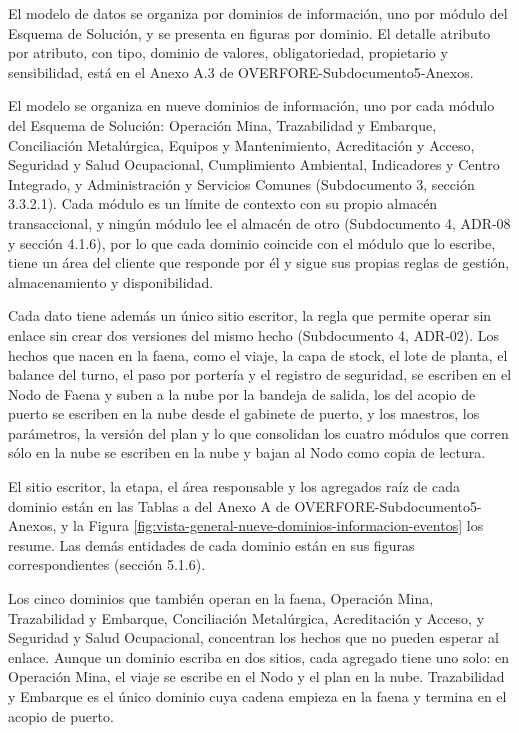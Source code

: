 \documentclass[subdoc]{../../comun/overfore}
\begin{document}
El modelo de datos se organiza por dominios de información, uno por módulo del Esquema de Solución, y se presenta en figuras por dominio. El detalle atributo por atributo, con tipo, dominio de valores, obligatoriedad, propietario y sensibilidad, está en el Anexo A.3 de OVERFORE-Subdocumento5-Anexos.

El modelo se organiza en nueve dominios de información, uno por cada módulo del Esquema de Solución: Operación Mina, Trazabilidad y Embarque, Conciliación Metalúrgica, Equipos y Mantenimiento, Acreditación y Acceso, Seguridad y Salud Ocupacional, Cumplimiento Ambiental, Indicadores y Centro Integrado, y Administración y Servicios Comunes (Subdocumento 3, sección 3.3.2.1). Cada módulo es un límite de contexto con su propio almacén transaccional, y ningún módulo lee el almacén de otro (Subdocumento 4, ADR-08 y sección 4.1.6), por lo que cada dominio coincide con el módulo que lo escribe, tiene un área del cliente que responde por él y sigue sus propias reglas de gestión, almacenamiento y disponibilidad.

Cada dato tiene además un único sitio escritor, la regla que permite operar sin enlace sin crear dos versiones del mismo hecho (Subdocumento 4, ADR-02). Los hechos que nacen en la faena, como el viaje, la capa de stock, el lote de planta, el balance del turno, el paso por portería y el registro de seguridad, se escriben en el Nodo de Faena y suben a la nube por la bandeja de salida, los del acopio de puerto se escriben en la nube desde el gabinete de puerto, y los maestros, los parámetros, la versión del plan y lo que consolidan los cuatro módulos que corren sólo en la nube se escriben en la nube y bajan al Nodo como copia de lectura.

El sitio escritor, la etapa, el área responsable y los agregados raíz de cada dominio están en las Tablas  a  del Anexo A de OVERFORE-Subdocumento5-Anexos, y la Figura \ref{fig:vista-general-nueve-dominios-informacion-eventos} los resume. Las demás entidades de cada dominio están en sus figuras correspondientes (sección 5.1.6).

Los cinco dominios que también operan en la faena, Operación Mina, Trazabilidad y Embarque, Conciliación Metalúrgica, Acreditación y Acceso, y Seguridad y Salud Ocupacional, concentran los hechos que no pueden esperar al enlace. Aunque un dominio escriba en dos sitios, cada agregado tiene uno solo: en Operación Mina, el viaje se escribe en el Nodo y el plan en la nube. Trazabilidad y Embarque es el único dominio cuya cadena empieza en la faena y termina en el acopio de puerto.
\end{document}
